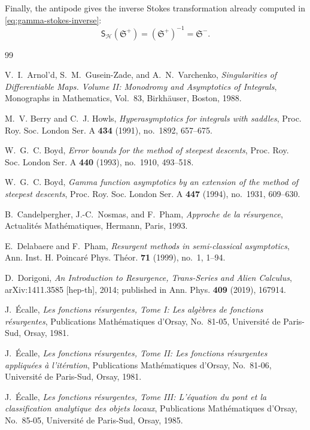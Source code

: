 \documentclass[11pt]{amsart}
\theoremstyle{plain}
\begin{document}
Finally, the antipode gives the inverse Stokes transformation already computed
in \eqref{eq:gamma-stokes-inverse}:
\[
\mathsf S_{\mathcal H}(\mathfrak S^+)
=
(\mathfrak S^+)^{-1}
=
\mathfrak S^-.
\]



\medskip
\begin{thebibliography}{99}

V.~I.~Arnol'd, S.~M.~Gusein-Zade, and A.~N.~Varchenko,
\textit{Singularities of Differentiable Maps. Volume II: Monodromy and Asymptotics of Integrals},
 Monographs in Mathematics, Vol.~83, Birkh\"auser, Boston, 1988.

M.~V. Berry and C.~J. Howls,
\textit{Hyperasymptotics for integrals with saddles},
Proc. Roy. Soc. London Ser. A \textbf{434} (1991), no.~1892, 657--675.

W.~G.~C. Boyd,
\textit{Error bounds for the method of steepest descents},
Proc. Roy. Soc. London Ser. A \textbf{440} (1993), no.~1910, 493--518.

W.~G.~C. Boyd,
\textit{Gamma function asymptotics by an extension of the method of steepest descents},
Proc. Roy. Soc. London Ser. A \textbf{447} (1994), no.~1931, 609--630.

B.~Candelpergher, J.-C.~Nosmas, and F.~Pham,
\textit{Approche de la r\'esurgence},
 Actualit\'es Math\'ematiques, Hermann, Paris, 1993.


E.~Delabaere and F.~Pham,
\textit{Resurgent methods in semi-classical asymptotics},
 Ann. Inst. H. Poincar\'e Phys. Th\'eor. \textbf{71} (1999), no.~1, 1--94.


D.~Dorigoni,
\textit{An Introduction to Resurgence, Trans-Series and Alien Calculus},
 arXiv:1411.3585 [hep-th], 2014; published in {Ann. Phys.} \textbf{409} (2019), 167914.

J.~\'Ecalle,
\textit{Les fonctions r\'esurgentes, Tome I: Les alg\`ebres de fonctions r\'esurgentes},
 Publications Math\'ematiques d'Orsay, No.~81-05, Universit\'e de Paris-Sud, Orsay, 1981.

J.~\'Ecalle,
\textit{Les fonctions r\'esurgentes, Tome II: Les fonctions r\'esurgentes appliqu\'ees \`a l'it\'eration},
 Publications Math\'ematiques d'Orsay, No.~81-06, Universit\'e de Paris-Sud, Orsay, 1981.

J.~\'Ecalle,
\textit{Les fonctions r\'esurgentes, Tome III: L'\'equation du pont et la classification analytique des objets locaux},
 Publications Math\'ematiques d'Orsay, No.~85-05, Universit\'e de Paris-Sud, Orsay, 1985.


\end{thebibliography}
\end{document}
